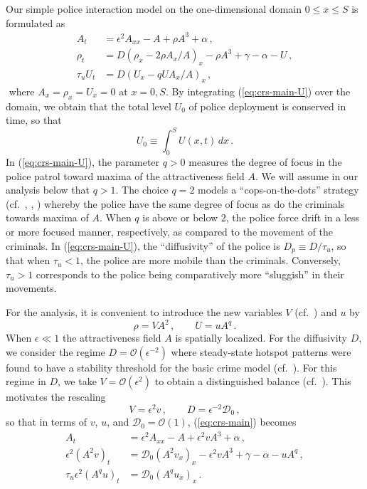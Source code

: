\documentclass{article}%
\newcommand{\bsub}{\begin{subequations}}
\newcommand{\esub}{\end{subequations}$\!$}
\begin{document}
Our simple police interaction model on the one-dimensional domain 
$0\leq x \leq S$ is formulated as
\bsub\label{eq:crs-main}
\begin{alignat}{1}
A_{t} & =\epsilon^{2}A_{xx}-A+\rho A^{3}+\alpha\,, \label{eq:crs-main-A}\\
\rho_{t} & =D\left(\rho_{x}-2\rho A_{x}/A\right)_{x}-\rho A^3 +\gamma-\alpha-
U\,, \label{eq:crs-main-rho}\\
\tau_{u}U_{t} & =D\left(U_{x}-qUA_{x}/A\right)_{x}\,,  \label{eq:crs-main-U}
\end{alignat}
\esub 
where $A_x=\rho_x=U_x=0$ at $x=0,S$. By integrating
(\ref{eq:crs-main-U}) over the domain, we obtain that the total level
$U_0$ of police deployment is conserved in time, so that
\begin{equation}\label{ss:pol_con}
   U_0 \equiv \int_{0}^{S} U(x,t)\, dx \,.
\end{equation}
In (\ref{eq:crs-main-U}), the parameter $q>0$ measures the degree of
focus in the police patrol toward maxima of the attractiveness field $A$.
We will assume in our analysis below that $q>1$.  The choice $q=2$
models a ``cops-on-the-dots'' strategy (cf.~\cite{jbc}, \cite{rick},
\cite{zipkin}) whereby the police have the same degree of focus as do
the criminals towards maxima of $A$. When $q$ is above or below $2$,
the police force drift in a less or more focused manner,
respectively, as compared to the movement of the criminals. In
(\ref{eq:crs-main-U}), the ``diffusivity'' of the police is
$D_p\equiv {D/\tau_{u}}$, so that when $\tau_{u}<1$, the police are more mobile
than the criminals. Conversely, $\tau_{u}>1$ corresponds to the police
being comparatively more ``sluggish'' in their movements.

For the analysis, it is convenient to introduce the new variables
$V$ (cf.~\cite{kww_crime}) and $u$ by
\begin{equation}\label{ss:new_var}
\rho=VA^{2}\,, \qquad U=uA^{q} \,.
\end{equation}
When $\epsilon\ll 1$ the attractiveness field $A$ is spatially
localized. For the diffusivity $D$, we consider the regime
$D={\mathcal O}(\epsilon^{-2})$ where steady-state hotspot patterns
were found to have a stability threshold for the basic crime model
(cf.~\cite{kww_crime}). For this regime in $D$, we take $V={\mathcal
  O}(\epsilon^{2})$ to obtain a distinguished balance
(cf.~\cite{kww_crime}).  This motivates the rescaling
\begin{equation}\label{ss:new_rescale}
V=\epsilon^{2}v \,,\qquad D= \epsilon^{-2} {\mathcal D}_{0} \,,
\end{equation}
so that in terms of $v$, $u$, and ${\mathcal D}_0={\mathcal O}(1)$,
(\ref{eq:crs-main}) becomes 
\bsub\label{eq:pol-main}
\begin{align}
A_{t} & =\epsilon^{2}A_{xx}-A+\epsilon^{2}vA^{3}+\alpha\,,
 \label{eq:pol-main-A}\\
\epsilon^{2}\left(A^{2}v\right)_{t} & ={\mathcal D}_{0}\left(A^{2}v_{x}\right)_{x}
-\epsilon^{2}vA^{3}+\gamma-\alpha-uA^{q}\,, \label{eq:pol-main-v}\\ 
\tau_{u}\epsilon^{2}\left(A^{q}u\right)_{t}
& ={\mathcal D}_{0}\left(A^{q}u_{x}\right)_{x} \,. \label{eq:pol-main-u}
\end{align}
\esub
\end{document}

